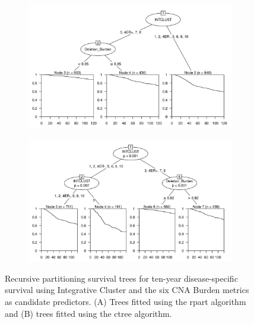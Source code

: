 \begin{figure}[!h]
\centering

\vspace{0.5cm}

\begin{subfigure}{\textwidth}
\subcaption{}
\includegraphics[width=1\textwidth]{../figures/Chapter_3/PartyKit_Survival_Burden_TenYearDSS_INTCLUST.png}
\end{subfigure}

\vspace{2cm}

\begin{subfigure}{\textwidth}
\subcaption{}
\includegraphics[width=1\textwidth]{../figures/Chapter_3/Ctree_Survival_Burden_TenYearDSS_INTCLUST.png}
\end{subfigure}

\vspace{0.5cm}

\caption[Recursive partitioning survival trees for ten-year disease-specific survival using Integrative Cluster and the six CNA Burden metrics as candidate predictors.]{Recursive partitioning survival trees for ten-year disease-specific survival using Integrative Cluster and the six CNA Burden metrics as candidate predictors. (A) Trees fitted using the rpart algorithm and (B) trees fitted using the ctree algorithm.}
\label{fig:INTCLUST_CNA_Burden_TenYearDSS}
\end{figure}


